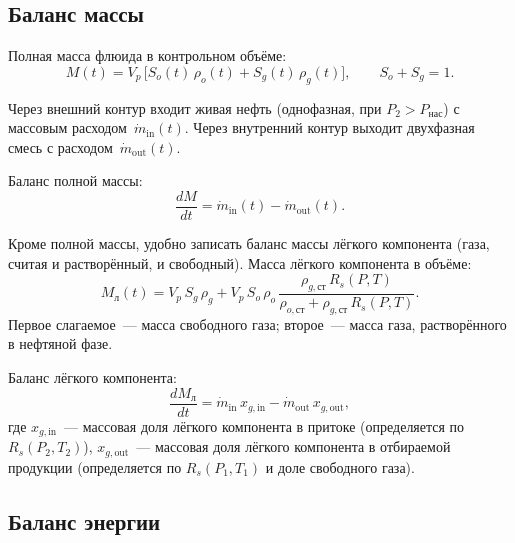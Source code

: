 \documentclass[12pt,a4paper]{article}
\begin{document}
\subsection{Баланс массы}

Полная масса флюида в контрольном объёме:
\begin{equation}\label{eq:M_CV}
  M(t) = V_p\,\bigl[S_o(t)\,\rho_o(t) + S_g(t)\,\rho_g(t)\bigr],
  \qquad S_o + S_g = 1.
\end{equation}

Через внешний контур входит живая нефть (однофазная, при $P_2 > P_{\text{нас}}$)
с массовым расходом~$\dot{m}_{\text{in}}(t)$.
Через внутренний контур выходит двухфазная смесь с расходом~$\dot{m}_{\text{out}}(t)$.

Баланс полной массы:
\begin{equation}\label{eq:mass_total}
  \boxed{\;\frac{dM}{dt} = \dot{m}_{\text{in}}(t) - \dot{m}_{\text{out}}(t).\;}
\end{equation}

Кроме полной массы, удобно записать баланс массы лёгкого компонента
(газа, считая и растворённый, и свободный). Масса лёгкого компонента
в объёме:
\begin{equation}\label{eq:Mg_CV}
  M_{\text{л}}(t) = V_p\,S_g\,\rho_g
    + V_p\,S_o\,\rho_o\,\frac{\rho_{g,\text{ст}}\,R_s(P,T)}
      {\rho_{o,\text{ст}} + \rho_{g,\text{ст}}\,R_s(P,T)}.
\end{equation}
Первое слагаемое~--- масса свободного газа; второе~--- масса газа,
растворённого в нефтяной фазе.

Баланс лёгкого компонента:
\begin{equation}\label{eq:mass_light}
  \frac{dM_{\text{л}}}{dt}
    = \dot{m}_{\text{in}}\,x_{g,\text{in}}
    - \dot{m}_{\text{out}}\,x_{g,\text{out}},
\end{equation}
где $x_{g,\text{in}}$~--- массовая доля лёгкого компонента в притоке
(определяется по $R_s(P_2, T_2)$), $x_{g,\text{out}}$~--- массовая доля
лёгкого компонента в отбираемой продукции (определяется по $R_s(P_1, T_1)$
и доле свободного газа).

\subsection{Баланс энергии}
\end{document}
